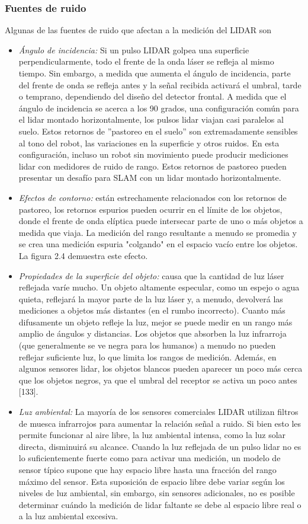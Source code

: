 \subsubsection{Fuentes de ruido}
Algunas de las fuentes de ruido que afectan a la medición del LIDAR son
\begin{itemize}
    \item \textit{Ángulo de incidencia:} Si un pulso LIDAR golpea una superficie perpendicularmente, todo el frente de la onda láser se refleja al mismo tiempo. Sin embargo, a medida que aumenta el ángulo de incidencia, parte del frente de onda se refleja antes y la señal recibida activará el umbral, tarde o temprano, dependiendo del diseño del detector frontal. A medida que el ángulo de incidencia se acerca a los 90 grados, una configuración común para el lidar montado horizontalmente, los pulsos lidar viajan casi paralelos al suelo. Estos retornos de ''pastoreo en el suelo'' son extremadamente sensibles al tono del robot, las variaciones en la superficie y otros ruidos. En esta configuración, incluso un robot sin movimiento puede producir mediciones lidar con medidores de ruido de rango. Estos retornos de pastoreo pueden presentar un desafío para SLAM con un lidar montado horizontalmente.
    \item \textit{Efectos de contorno:} están estrechamente relacionados con los retornos de pastoreo, los retornos espurios pueden ocurrir en el límite de los objetos, donde el frente de onda elíptica puede intersecar parte de uno o más objetos a medida que viaja. La medición del rango resultante a menudo se promedia y se crea una medición espuria "colgando" en el espacio vacío entre los objetos. La figura 2.4 demuestra este efecto.
    \item \textit{Propiedades de la superficie del objeto:} causa que la cantidad de luz láser reflejada varíe mucho. Un objeto altamente especular, como un espejo o agua quieta, reflejará la mayor parte de la luz láser y, a menudo, devolverá las mediciones a objetos más distantes (en el rumbo incorrecto). Cuanto más difusamente un objeto refleje la luz, mejor se puede medir en un rango más amplio de ángulos y distancias. Los objetos que absorben la luz infrarroja (que generalmente se ve negra para los humanos) a menudo no pueden reflejar suficiente luz, lo que limita los rangos de medición. Además, en algunos sensores lidar, los objetos blancos pueden aparecer un poco más cerca que los objetos negros, ya que el umbral del receptor se activa un poco antes [133].
    \item \textit{Luz ambiental:} La mayoría de los sensores comerciales LIDAR utilizan filtros de muesca infrarrojos para aumentar la relación señal a ruido. Si bien esto les permite funcionar al aire libre, la luz ambiental intensa, como la luz solar directa, disminuirá su alcance. Cuando la luz reflejada de un pulso lidar no es lo suficientemente fuerte como para activar una medición, un modelo de sensor típico supone que hay espacio libre hasta una fracción del rango máximo del sensor. Esta suposición de espacio libre debe variar según los niveles de luz ambiental, sin embargo, sin sensores adicionales, no es posible determinar cuándo la medición de lidar faltante se debe al espacio libre real o a la luz ambiental excesiva.

\end{itemize}
